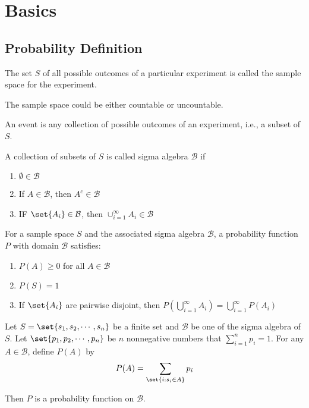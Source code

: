 \chapter{Basics}

\section{Probability Definition}

\begin{definition}
    The set $S$ of all possible outcomes of a particular experiment is called the sample space for the experiment.
\end{definition}

The sample space could be either countable or uncountable.

\begin{definition}[Event]
    An event is any collection of possible outcomes of an experiment, i.e., a subset of $S$.
\end{definition}

\begin{definition}
    A collection of subsets of $S$ is called sigma algebra $\mathcal{B}$ if
    \begin{enumerate}
        \item $\emptyset \in \mathcal{B}$
        \item If $A \in \mathcal{B}$, then $A^c \in \mathcal{B}$
        \item IF $\set{A_i} \in \mathcal{B}$, then $\cup_{i=1}^\infty A_i \in \mathcal{B}$
    \end{enumerate}
\end{definition}


\begin{definition}
    For a sample space $S$ and the associated sigma algebra $\mathcal{B}$, a probability function $P$ with domain $\mathcal{B}$ satisfies:
    \begin{enumerate}
        \item $P(A) \geq 0$ for all $A \in \mathcal{B}$
        \item $P(S) = 1$
        \item If $\set{A_i}$ are pairwise disjoint, then $P(\bigcup_{i=1}^\infty A_i) = \bigcup_{i=1}^\infty P(A_i)$
    \end{enumerate}
\end{definition}

\begin{theorem}
    Let $S=\set{s_1, s_2, \cdots, s_n}$ be a finite set and $\mathcal{B}$ be one of the sigma algebra of $S$. Let $\set{p_1, p_2, \cdots, p_n}$ be $n$ nonnegative numbers that $\sum_{i=1}^n p_i = 1$. For any $A\in \mathcal{B}$, define $P(A)$ by
    \begin{equation}
        P(A) = \sum_{\set{i: s_i \in A}} p_i
    \end{equation}
    
    Then $P$ is a probability function on $\mathcal{B}$.
\end{theorem}


